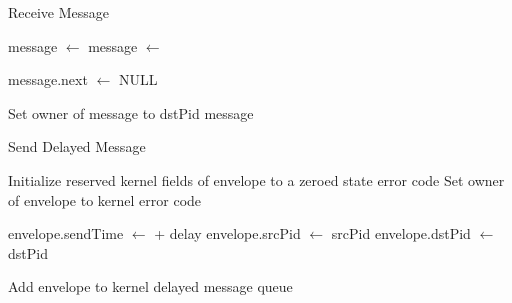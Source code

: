 \documentclass[12pt]{report}
\begin{document}
    \begin{algorithm}
    \caption{Receive Message}
    \label{code:receive_message}
    \begin{algorithmic}[1]
            \State message $\gets$ 
             
                \State {} 
                \State message $\gets$ 
            \EndWhile

            \State {}

            \State message.next $\gets$ NULL

            \State Set owner of message to dstPid
            \State \Return message
        \EndFunction
    \end{algorithmic}
    \end{algorithm}

    \begin{algorithm}
    \caption{Send Delayed Message}
    \label{code:send_delayed_message}
    \begin{algorithmic}[1]
            \State Initialize reserved kernel fields of envelope to a zeroed state
                \State \Return error code
            \EndIf
                \State Set owner of envelope to kernel
            \Else
                \State \Return error code
            \EndIf

            \State envelope.sendTime $\gets$  + delay
            \State envelope.srcPid $\gets$ srcPid
            \State envelope.dstPid $\gets$ dstPid

            \State Add envelope to kernel delayed message queue
        \EndFunction
    \end{algorithmic}
    \end{algorithm}
\end{document}
